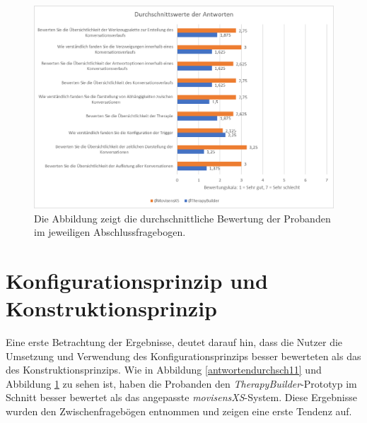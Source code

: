 \begin{figure}[h]
\centering
\includegraphics[width=1\textwidth]{pictures/diagramme/antwortendurchsch2}
\caption{Die Abbildung zeigt die durchschnittliche Bewertung der Probanden im jeweiligen Abschlussfragebogen.}
\label{antwortendurchsch22}
\end{figure}


\section{Konfigurationsprinzip und Konstruktionsprinzip}
Eine erste Betrachtung der Ergebnisse, deutet darauf hin, dass die Nutzer die Umsetzung und Verwendung des Konfigurationsprinzips besser bewerteten als das des Konstruktionsprinzips. Wie in Abbildung \ref{antwortendurchsch11} und Abbildung \ref{antwortendurchsch22} zu sehen ist, haben die Probanden den \emph{TherapyBuilder}-Prototyp im Schnitt besser bewertet als das angepasste \emph{movisensXS}-System. Diese Ergebnisse wurden den Zwischenfragebögen entnommen und zeigen eine erste Tendenz auf. 

